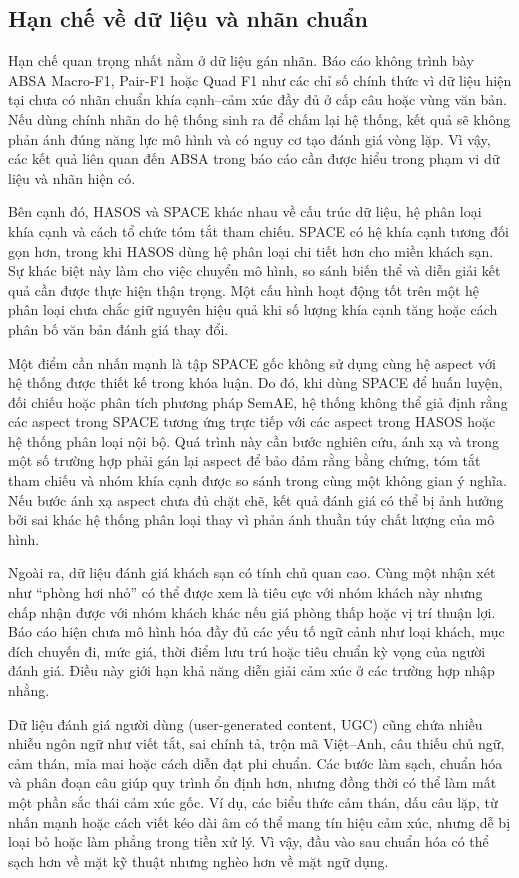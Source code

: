 \subsection{Hạn chế về dữ liệu và nhãn chuẩn}

Hạn chế quan trọng nhất nằm ở dữ liệu gán nhãn. Báo cáo không trình bày ABSA Macro-F1, Pair-F1 hoặc Quad F1 như các chỉ số chính thức vì dữ liệu hiện tại chưa có nhãn chuẩn khía cạnh--cảm xúc đầy đủ ở cấp câu hoặc vùng văn bản. Nếu dùng chính nhãn do hệ thống sinh ra để chấm lại hệ thống, kết quả sẽ không phản ánh đúng năng lực mô hình và có nguy cơ tạo đánh giá vòng lặp. Vì vậy, các kết quả liên quan đến ABSA trong báo cáo cần được hiểu trong phạm vi dữ liệu và nhãn hiện có.

Bên cạnh đó, HASOS và SPACE khác nhau về cấu trúc dữ liệu, hệ phân loại khía cạnh và cách tổ chức tóm tắt tham chiếu. SPACE có hệ khía cạnh tương đối gọn hơn, trong khi HASOS dùng hệ phân loại chi tiết hơn cho miền khách sạn. Sự khác biệt này làm cho việc chuyển mô hình, so sánh biến thể và diễn giải kết quả cần được thực hiện thận trọng. Một cấu hình hoạt động tốt trên một hệ phân loại chưa chắc giữ nguyên hiệu quả khi số lượng khía cạnh tăng hoặc cách phân bố văn bản đánh giá thay đổi.

Một điểm cần nhấn mạnh là tập SPACE gốc không sử dụng cùng hệ aspect với hệ thống được thiết kế trong khóa luận. Do đó, khi dùng SPACE để huấn luyện, đối chiếu hoặc phân tích phương pháp SemAE, hệ thống không thể giả định rằng các aspect trong SPACE tương ứng trực tiếp với các aspect trong HASOS hoặc hệ thống phân loại nội bộ. Quá trình này cần bước nghiên cứu, ánh xạ và trong một số trường hợp phải gán lại aspect để bảo đảm rằng bằng chứng, tóm tắt tham chiếu và nhóm khía cạnh được so sánh trong cùng một không gian ý nghĩa. Nếu bước ánh xạ aspect chưa đủ chặt chẽ, kết quả đánh giá có thể bị ảnh hưởng bởi sai khác hệ thống phân loại thay vì phản ánh thuần túy chất lượng của mô hình.

Ngoài ra, dữ liệu đánh giá khách sạn có tính chủ quan cao. Cùng một nhận xét như ``phòng hơi nhỏ'' có thể được xem là tiêu cực với nhóm khách này nhưng chấp nhận được với nhóm khách khác nếu giá phòng thấp hoặc vị trí thuận lợi. Báo cáo hiện chưa mô hình hóa đầy đủ các yếu tố ngữ cảnh như loại khách, mục đích chuyến đi, mức giá, thời điểm lưu trú hoặc tiêu chuẩn kỳ vọng của người đánh giá. Điều này giới hạn khả năng diễn giải cảm xúc ở các trường hợp nhập nhằng.

Dữ liệu đánh giá người dùng (user-generated content, UGC) cũng chứa nhiều nhiễu ngôn ngữ như viết tắt, sai chính tả, trộn mã Việt--Anh, câu thiếu chủ ngữ, cảm thán, mỉa mai hoặc cách diễn đạt phi chuẩn. Các bước làm sạch, chuẩn hóa và phân đoạn câu giúp quy trình ổn định hơn, nhưng đồng thời có thể làm mất một phần sắc thái cảm xúc gốc. Ví dụ, các biểu thức cảm thán, dấu câu lặp, từ nhấn mạnh hoặc cách viết kéo dài âm có thể mang tín hiệu cảm xúc, nhưng dễ bị loại bỏ hoặc làm phẳng trong tiền xử lý. Vì vậy, đầu vào sau chuẩn hóa có thể sạch hơn về mặt kỹ thuật nhưng nghèo hơn về mặt ngữ dụng.

